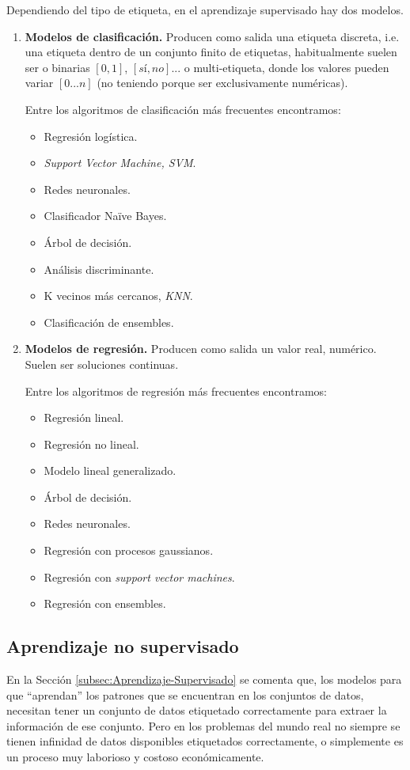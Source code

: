 Dependiendo del tipo de etiqueta, en el aprendizaje supervisado hay dos modelos.\cite{supervised_learning_mathworks_inc}
\begin{enumerate}
	\item \textbf{Modelos de clasificación.} Producen como salida una etiqueta discreta, i.e. una etiqueta dentro de un conjunto finito de etiquetas, habitualmente suelen ser o binarias $[0,1]$, $[sí,no]$... o multi-etiqueta, donde los valores pueden variar $[0...n]$ (no teniendo porque ser exclusivamente numéricas).

Entre los algoritmos de clasificación más frecuentes encontramos:
	\begin{itemize}
	\item Regresión logística.
	\item \textit{Support Vector Machine, SVM}.
	\item Redes neuronales.
	\item Clasificador Naïve Bayes.
	\item Árbol de decisión.
	\item Análisis discriminante.
	\item K vecinos más cercanos, \textit{KNN}.
	\item Clasificación de ensembles.
	\end{itemize}
	\item \textbf{Modelos de regresión.} Producen como salida un valor real, numérico. Suelen ser soluciones continuas.
	
	Entre los algoritmos de regresión más frecuentes encontramos:
	\begin{itemize}
	\item Regresión lineal.
	\item Regresión no lineal.
	\item Modelo lineal generalizado.
	\item Árbol de decisión.
	\item Redes neuronales.
	\item Regresión con procesos gaussianos.
	\item Regresión con \textit{support vector machines}.
	\item Regresión con ensembles.
	\end{itemize}
	
\end{enumerate}

\subsection{Aprendizaje no supervisado}\label{subsec:Aprendizaje-No-Supervisado}
En la Sección \ref{subsec:Aprendizaje-Supervisado} se comenta que, los modelos para que ``aprendan'' los patrones que se encuentran en los conjuntos de datos, necesitan tener un conjunto de datos etiquetado correctamente para extraer la información de ese conjunto. Pero en los problemas del mundo real no siempre se tienen infinidad de datos disponibles etiquetados correctamente, o simplemente es un proceso muy laborioso y costoso económicamente.

